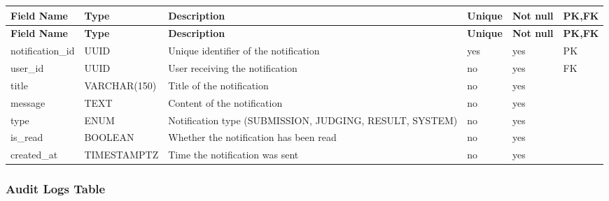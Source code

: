 \vspace{0.5em}
\renewcommand{\arraystretch}{1.15}
\setlength{\tabcolsep}{4pt}
\small
\begin{longtable}{|>{\raggedright\arraybackslash}p{}|>{\raggedright\arraybackslash}p{}|>{\raggedright\arraybackslash}p{}|>{\centering\arraybackslash}p{}|>{\centering\arraybackslash}p{}|>{\centering\arraybackslash}p{}|}
\hline
\textbf{Field Name} & \textbf{Type} & \textbf{Description} & \textbf{Unique} & \textbf{Not null} & \textbf{PK,FK} \\
\hline
\endfirsthead
\textbf{Field Name} & \textbf{Type} & \textbf{Description} & \textbf{Unique} & \textbf{Not null} & \textbf{PK,FK} \\
\hline
\endhead
notification\_id & UUID & Unique identifier of the notification & yes & yes & PK \\
\hline
user\_id & UUID & User receiving the notification & no & yes & FK \\
\hline
title & VARCHAR(150) & Title of the notification & no & yes & \\
\hline
message & TEXT & Content of the notification & no & yes & \\
\hline
type & ENUM & Notification type (SUBMISSION, JUDGING, RESULT, SYSTEM) & no & yes & \\
\hline
is\_read & BOOLEAN & Whether the notification has been read & no & yes & \\
\hline
created\_at & TIMESTAMPTZ & Time the notification was sent & no & yes & \\
\hline
\end{longtable}

\vspace{1em}
\subsubsection{Audit Logs Table}
\label{subsubsec:audit-logs-table}

